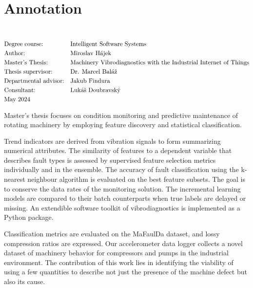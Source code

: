 \thispagestyle{empty}
\section*{Annotation}
\UniversityEN \\
\uppercase{\FacultyEN}
\vspace{-8pt}
{\setlength{\mathindent}{0cm}
\begin{align*}
&\text{Degree course:} && \text{\StudyProgrammeEN} \\
&\text{Author:} && \text{\AuthorEN} \\
&\text{\ThesisEN:} && \text{\TitleEN} \\
&\text{Thesis supervisor:} && \text{\SupervisorEN} \\
&\text{Departmental advisor:} && \text{\DepartmentalAdvisorEN} \\
&\text{Consultant:} && \text{\ConsultantEN} \\
&\text{\DateEN}
\end{align*}}

Master's thesis focuses on condition monitoring and predictive maintenance of rotating machinery by employing feature discovery and statistical classification. 

Trend indicators are derived from vibration signals to form summarizing numerical attributes. The similarity of features to a dependent variable that describes fault types is assessed by supervised feature selection metrics individually and in the ensemble. The accuracy of fault classification using the k-nearest neighbour algorithm is evaluated on the best feature subsets. The goal is to conserve the data rates of the monitoring solution. The incremental learning models are compared to their batch counterparts when true labels are delayed or missing. An extendible software toolkit of vibrodiagnostics is implemented as a Python package.

Classification metrics are evaluated on the MaFaulDa dataset, and lossy compression ratios are expressed. Our accelerometer data logger collects a novel dataset of machinery behavior for compressors and pumps in the industrial environment. The contribution of this work lies in identifying the viability of using a few quantities to describe not just the presence of the machine defect but also its cause.
\emptypage 

\thispagestyle{empty}
